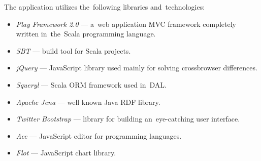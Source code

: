 The application utilizes the~following libraries and~technologies:
\begin{itemize}
  \item \emph{Play Framework 2.0} --- a~web application MVC framework completely written 
  in~the~Scala programming language.
  \item \emph{SBT} --- build tool for Scala projects.
  \item \emph{jQuery} --- JavaScript library used mainly for solving crossbrowser 
  differences.
  \item \emph{Squeryl} --- Scala ORM framework used in~DAL.
  \item \emph{Apache Jena} --- well known Java RDF library.
  \item \emph{Twitter Bootstrap} --- library for building an~eye-catching user 
  interface.
  \item \emph{Ace} --- JavaScript editor for programming languages.
  \item \emph{Flot} --- JavaScript chart library.
\end{itemize}

